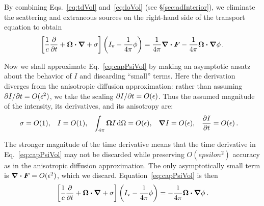 By combining Eqs.~\eqref{eq:tdVol} and~\eqref{eq:loVol} (see
\S\ref{sec:adInterior}), we eliminate the scattering and extraneous sources on
the right-hand side of the transport equation to obtain
\begin{equation}\tagref{eq:capPsiVol}
  \left[ \frac{1}{c}\pder{}{t}
  + \vec{\Omega}\vd \grad
  + \sigma \right]
   \left( \Iv
  - \frac{1}{4\pi} \phi \right)
  = \frac{1}{4\pi} \grad \vd\vec{F} -
  \frac{1}{4\pi} \vec{\Omega}\vd \grad \phi\,.
\end{equation}

Now we shall approximate Eq.~\eqref{eq:capPsiVol} by making an asymptotic ansatz
about the behavior of $I$ and discarding ``small'' terms. Here the derivation
diverges from the anisotropic diffusion approximation: rather than assuming
${\partial I}/{\partial t} = O(\epsilon^2)$, we take the scaling ${\partial I}/{\partial t} =
O(\epsilon)$. Thus the assumed magnitude of the intensity, its derivatives, and
its anisotropy are:
\begin{align} \label{eq:ap1ansatz}
  \sigma &= O(1), &
  I &= O(1), &
  \int_{4\pi} \bm{\Omega} I \mathop{}\!\mathrm{d}\Omega &= O(\epsilon), &
  \bm{\nabla} I &= O(\epsilon), &
  \frac{\partial I}{\partial t} &= O(\epsilon) \,.
\end{align}

The stronger magnitude of the time derivative means that the time derivative in
Eq.~\eqref{eq:capPsiVol} may not be discarded while preserving $O(epsilon^2)$
accuracy as in the anisotropic diffusion approximation. The only asymptotically
small term is $\bm{\nabla} \bm{\cdot}\bm{F} = O(\epsilon^2)$, which we discard.
Equation~\eqref{eq:capPsiVol} is then
\begin{equation*}
  \left[ \frac{1}{c}\frac{\partial }{\partial t}
  + \bm{\Omega}\bm{\cdot} \bm{\nabla}
  + \sigma \right]
   \left( I_\mathrm{v} - \frac{1}{4\pi} \phi \right)
  = - \frac{1}{4\pi} \bm{\Omega}\bm{\cdot} \bm{\nabla} \phi\,.
\end{equation*}

